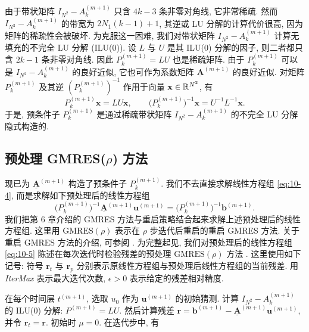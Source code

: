由于带状矩阵 $I_{N^{2}}-A_{k}^{(m+1)}$ 只含 $4k-3$ 条非零对角线, 它非常稀疏. 然而 $I_{N^{2}}-A_{k}^{(m+1)}$ 的带宽为 $2N_{1}(k-1)+1$, 其逆或 LU 分解的计算代价很高, 因为矩阵的稀疏性会被破坏. 为克服这一困难, 我们对带状矩阵 $I_{N^{2}}-A_{k}^{(m+1)}$ 计算无填充的不完全 LU 分解 (ILU(0)). 设 $L$ 与 $U$ 是其 ILU(0) 分解的因子, 则二者都只含 $2k-1$ 条非零对角线. 因此 $P_{k}^{(m+1)}=LU$ 也是稀疏矩阵. 由于 $P_{k}^{(m+1)}$ 可以是 $I_{N^{2}}-A_{k}^{(m+1)}$ 的良好近似, 它也可作为系数矩阵 $\underline{\mathbf{A}}^{(m+1)}$ 的良好近似. 对矩阵 $P_{k}^{(m+1)}$ 及其逆 $(P_{k}^{(m+1)})^{-1}$ 作用于向量 $\mathbf{x}\in\mathbb{R}^{N^{2}}$, 有
\[
  P_{k}^{(m+1)}\mathbf{x}=LU\mathbf{x},\qquad
  \bigl(P_{k}^{(m+1)}\bigr)^{-1}\mathbf{x}=U^{-1}L^{-1}\mathbf{x}.
\]
于是, 预条件子 $P_{k}^{(m+1)}$ 是通过稀疏带状矩阵 $I_{N^{2}}-A_{k}^{(m+1)}$ 的不完全 LU 分解隐式构造的.

\subsection{预处理 GMRES($\rho$) 方法}
\label{sec:10-3-2}

现已为 $\underline{\mathbf{A}}^{(m+1)}$ 构造了预条件子 $P_{k}^{(m+1)}$. 我们不去直接求解线性方程组 \eqref{eq:10-4}, 而是求解如下预处理后的线性方程组
\begin{equation}
  \bigl(P_{k}^{(m+1)}\bigr)^{-1}\underline{\mathbf{A}}^{(m+1)}\mathbf{u}^{(m+1)}
  =\bigl(P_{k}^{(m+1)}\bigr)^{-1}\mathbf{b}^{(m+1)}.
\label{eq:10-5}
\end{equation}
我们把第 6 章介绍的 GMRES 方法与重启策略结合起来求解上述预处理后的线性方程组. 这里用 $\mathrm{GMRES}(\rho)$ 表示在 $\rho$ 步迭代后重启的重启 GMRES 方法. 关于重启 GMRES 方法的介绍, 可参阅 \cite{src:70}. 为完整起见, 我们对预处理后的线性方程组 \eqref{eq:10-5} 陈述在每次迭代时检验残差的预处理 $\mathrm{GMRES}(\rho)$ 方法 \cite{src:59}. 这里使用如下记号: 符号 $\mathbf{r}_{t}$ 与 $\mathbf{r}_{p}$ 分别表示原线性方程组与预处理后线性方程组的当前残差. 用 \textit{IterMax} 表示最大迭代次数, $\epsilon>0$ 表示给定的残差相对精度.

在每个时间层 $t^{(m+1)}$, 选取 $u_{0}$ 作为 $\mathbf{u}^{(m+1)}$ 的初始猜测. 计算 $I_{N^{2}}-A_{k}^{(m+1)}$ 的 ILU(0) 分解: $P^{(m+1)}=LU$. 然后计算残差 $\mathbf{r}=\mathbf{b}^{(m+1)}-\underline{\mathbf{A}}^{(m+1)}\mathbf{u}^{(m+1)}$, 并令 $\mathbf{r}_{t}=\mathbf{r}$. 初始时 $\mu=0$. 在迭代步中, 有

